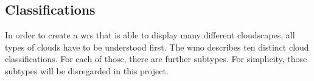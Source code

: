 \begin{figure}[H]
\begin{minipage}{0.47\linewidth}
        \label{img:tikz:fronts:occluded4}       
    \end{minipage}
\end{figure}

\clearpage

\subsection{Classifications}
\label{section:clouds:types}
In order to create a \gls{wrs} that is able to display many different cloudscapes, all types of clouds have to be understood first.
The \gls{wmo} describes ten distinct cloud classifications. For each of those, there are further subtypes. For simplicity, those subtypes will be disregarded in this project.


